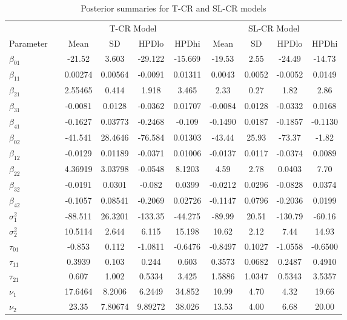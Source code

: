 \documentclass[10.5pt]{article} %
\begin{document}
\begin{table}[H]
\centering
\caption{Posterior summaries for T-CR and SL-CR models}
\begin{tabular}{llcccc|cccc}
\toprule
 & & \multicolumn{4}{c|}{T-CR Model} & \multicolumn{4}{c}{SL-CR Model} \\
Parameter & & Mean & SD & HPDlo & HPDhi & Mean & SD & HPDlo & HPDhi \\
\midrule
$\beta_{01}$ && -21.52 & 3.603 & -29.122 & -15.669 & -19.53 & 2.55 & -24.49 & -14.73 \\
$\beta_{11}$ && 0.00274 & 0.00564 & -0.0091 & 0.01311 & 0.0043 & 0.0052 & -0.0052 & 0.0149 \\
$\beta_{21}$ && 2.55465 & 0.414 & 1.918 & 3.465 & 2.33 & 0.27 & 1.82 & 2.86 \\
$\beta_{31}$ && -0.0081 & 0.0128 & -0.0362 & 0.01707 & -0.0084 & 0.0128 & -0.0332 & 0.0168 \\
$\beta_{41}$ && -0.1627 & 0.03773 & -0.2468 & -0.109 & -0.1490 & 0.0187 & -0.1857 & -0.1130 \\
$\beta_{02}$ && -41.541 & 28.4646 & -76.584 & 0.01303 & -43.44 & 25.93 & -73.37 & -1.82 \\
$\beta_{12}$ && -0.0129 & 0.01189 & -0.0371 & 0.01006 & -0.0137 & 0.0117 & -0.0374 & 0.0089 \\
$\beta_{22}$ && 4.36919 & 3.03798 & -0.0548 & 8.1203 & 4.59 & 2.78 & 0.0403 & 7.70 \\
$\beta_{32}$ && -0.0191 & 0.0301 & -0.082 & 0.0399 & -0.0212 & 0.0296 & -0.0828 & 0.0374 \\
$\beta_{42}$ && -0.1057 & 0.08541 & -0.2069 & 0.02726 & -0.1147 & 0.0796 & -0.2036 & 0.0199 \\
$\sigma^2_1$ && -88.511 & 26.3201 & -133.35 & -44.275 & -89.99 & 20.51 & -130.79 & -60.16 \\
$\sigma^2_2$ && 10.5114 & 2.644 & 6.115 & 15.198 & 10.62 & 2.12 & 7.44 & 14.93 \\
$\tau_{01}$ && -0.853 & 0.112 & -1.0811 & -0.6476 & -0.8497 & 0.1027 & -1.0558 & -0.6500 \\
$\tau_{11}$ && 0.3939 & 0.103 & 0.244 & 0.603 & 0.3573 & 0.0682 & 0.2487 & 0.4910 \\
$\tau_{21}$ && 0.607 & 1.002 & 0.5334 & 3.425 & 1.5886 & 1.0347 & 0.5343 & 3.5357 \\
$\nu_1$ && 17.6464 & 8.2006 & 6.2449 & 34.852 & 10.99 & 4.70 & 4.32 & 19.66 \\
$\nu_2$ && 23.35 & 7.80674 & 9.89272 & 38.026 & 13.53 & 4.00 & 6.68 & 20.00 \\
\bottomrule
\end{tabular}
\end{table}
\end{document}
